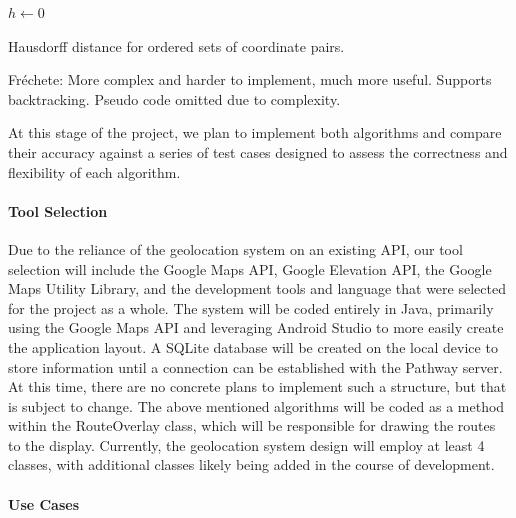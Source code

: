 \documentclass{article}
\begin{document}
\begin{algorithm}[h]
\SetAlgoLined
$h \gets 0$\\
\caption{Hausdorff distance for ordered sets of coordinate pairs.}
\end{algorithm}

Fréchete: More complex and harder to implement, much more useful. Supports backtracking. Pseudo code omitted due to complexity.

At this stage of the project, we plan to implement both algorithms and compare their accuracy against a series of test cases designed to assess the correctness and flexibility of each algorithm.

\paragraph{Tool Selection}
Due to the reliance of the geolocation system on an existing API, our tool selection will include the Google Maps API, Google Elevation API, the Google Maps Utility Library, and the development tools and language that were selected for the project as a whole. The system will be coded entirely in Java, primarily using the Google Maps API and leveraging Android Studio to more easily create the application layout. A SQLite database will be created on the local device to store information until a connection can be established with the Pathway server. At this time, there are no concrete plans to implement such a structure, but that is subject to change. The above mentioned algorithms will be coded as a method within the RouteOverlay class, which will be responsible for drawing the routes to the display. Currently, the geolocation system design will employ at least 4 classes, with additional classes likely being added in the course of development. 

\paragraph{Use Cases}
\end{document}
